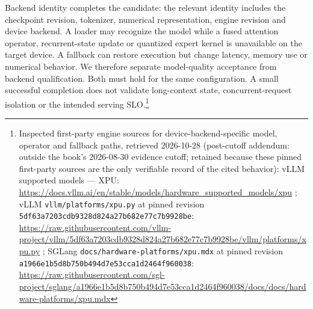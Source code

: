 Backend identity completes the candidate: the relevant identity includes
the checkpoint revision, tokenizer, numerical representation, engine
revision and device backend. A loader may recognize the model while a
fused attention operator, recurrent-state update or quantized expert
kernel is unavailable on the target device. A fallback can restore
execution but change latency, memory use or numerical behavior. We
therefore separate model-quality acceptance from backend qualification.
Both must hold for the same configuration. A small successful completion
does not validate long-context state, concurrent-request isolation or
the intended serving SLO.\footnote{Inspected first-party engine sources
  for device-backend-specific model, operator and fallback paths,
  retrieved 2026-10-28 (post-cutoff addendum: outside the book's
  2026-08-30 evidence cutoff; retained because these pinned first-party
  sources are the only verifiable record of the cited behavior): vLLM
  supported models --- XPU:
  \url{https://docs.vllm.ai/en/stable/models/hardware_supported_models/xpu}
  ; vLLM \texttt{vllm/platforms/xpu.py} at pinned revision
  \texttt{5df63a7203cdb9328d824a27b682e77c7b9928be}:
  \url{https://raw.githubusercontent.com/vllm-project/vllm/5df63a7203cdb9328d824a27b682e77c7b9928be/vllm/platforms/xpu.py}
  ; SGLang \texttt{docs/hardware-platforms/xpu.mdx} at pinned revision
  \texttt{a1966e1b5d8b750b494d7e53cca1d2464f960038}:
  \url{https://raw.githubusercontent.com/sgl-project/sglang/a1966e1b5d8b750b494d7e53cca1d2464f960038/docs/docs/hardware-platforms/xpu.mdx}}

\label{common-mistakes}


